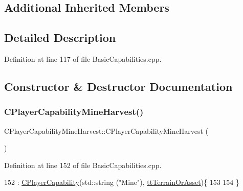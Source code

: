 \subsection*{Additional Inherited Members}


\subsection{Detailed Description}


Definition at line 117 of file Basic\+Capabilities.\+cpp.



\subsection{Constructor \& Destructor Documentation}
\hypertarget{classCPlayerCapabilityMineHarvest_aa170d0c33386809d234b73a2b0cf516d}{}\label{classCPlayerCapabilityMineHarvest_aa170d0c33386809d234b73a2b0cf516d} 
\subsubsection{\texorpdfstring{C\+Player\+Capability\+Mine\+Harvest()}{CPlayerCapabilityMineHarvest()}}
{\footnotesize\ttfamily C\+Player\+Capability\+Mine\+Harvest\+::\+C\+Player\+Capability\+Mine\+Harvest (\begin{DoxyParamCaption}{ }\end{DoxyParamCaption})\hspace{0.3cm}{\ttfamily [protected]}}



Definition at line 152 of file Basic\+Capabilities.\+cpp.


\begin{DoxyCode}
152                                                            : \hyperlink{classCPlayerCapability_a303de62aba5d3f65d9a8e013c64a96c1}{CPlayerCapability}(std::string
      (\textcolor{stringliteral}{"Mine"}), \hyperlink{classCPlayerCapability_a9d3450ed1532fd536bd6cbb1e2eef02fa67cc6d11bc0aafc1b786bd6557ba4aa2}{ttTerrainOrAsset})\{
153 
154 \}
\end{DoxyCode}
\hypertarget{classCPlayerCapabilityMineHarvest_aae786f3ba01e3f26359a38166af77ce5}{}\label{classCPlayerCapabilityMineHarvest_aae786f3ba01e3f26359a38166af77ce5} 
